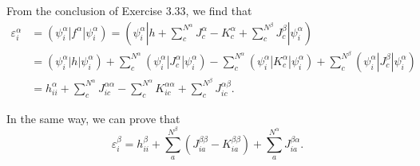 \documentclass[a4paper]{book}
\newcounter{solution}[chapter]
\begin{document}
	\begin{solution}
	
	From the conclusion of Exercise 3.33, we find that
	\begin{align*}
		\varepsilon^\alpha_i &= ( \psi^\alpha_i | f^\alpha | \psi^\alpha_i ) = \left( \psi^\alpha_i \left| h + \sum_c^{N^\alpha} J^\alpha_c - K^\alpha_c + \sum_c^{N^\beta} J^\beta_c \right| \psi^\alpha_i \right) \\
		&= ( \psi^\alpha_i | h | \psi^\alpha_i ) + \sum_c^{N^\alpha} ( \psi^\alpha_i | J^\alpha_c | \psi^\alpha_i ) - \sum_c^{N^\alpha} ( \psi^\alpha_i | K^\alpha_c | \psi^\alpha_i ) + \sum_c^{N^\beta} ( \psi^\alpha_i | J^\beta_c | \psi^\alpha_i ) \\
		&= h^\alpha_{ii} + \sum_c^{N^\alpha} J^{\alpha\alpha}_{ic} - \sum_c^{N^\alpha} K^{\alpha\alpha}_{ic} + \sum_c^{N^\beta} J^{\alpha\beta}_{ic} .
	\end{align*}
	
	In the same way, we can prove that
	\[
		\varepsilon^\beta_i = h^\beta_{ii} + \sum^{N^\beta}_a \left( J^{\beta\beta}_{ia} - K^{\beta\beta}_{ia} \right) + \sum^{N^\alpha}_a J^{\beta\alpha}_{ia} .
	\]
	

\end{solution}
\end{document}
